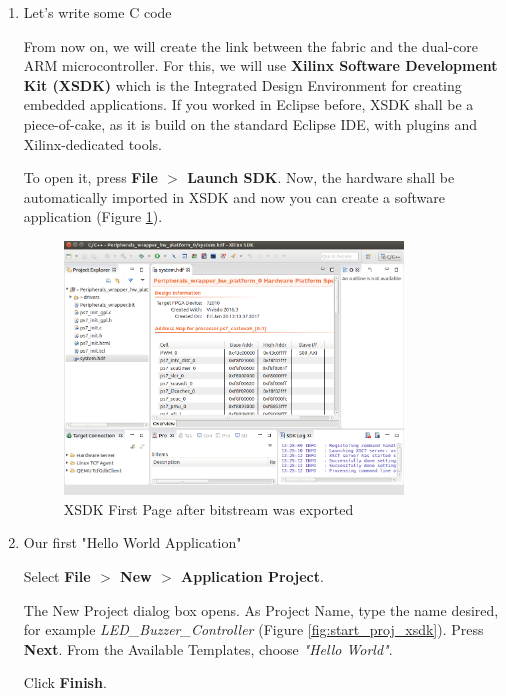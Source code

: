 \documentclass[portrait, margin=0.3in]{article}
\begin{document}
\begin{enumerate}
\newpage
 \item Let's write some C code 

From now on, we will create the link between the fabric and the dual-core ARM microcontroller. For this, we will use \textbf{Xilinx Software Development Kit (XSDK)} which is the Integrated Design Environment for creating embedded applications. If you worked in Eclipse before, XSDK shall be a piece-of-cake, as it is build on the standard Eclipse IDE, with plugins and Xilinx-dedicated tools. 

To open it, press \textbf{File $>$ Launch SDK}. Now, the hardware shall be automatically imported in XSDK and now you can create a software application (Figure \ref{fig:sdk_first_page}).



 
 \begin{figure}[h!]
    \centering
    \includegraphics[width=0.85\textwidth]{img/xsdk_first_page.png}
    \caption{XSDK First Page after bitstream was exported}
    \label{fig:sdk_first_page}
\end{figure}



 \item Our first "Hello World Application"

Select \textbf{File $>$ New $>$ Application Project}.

The New Project dialog box opens. As Project Name, type the name desired, for example
\textit{LED\_Buzzer\_Controller} (Figure \ref{fig:start_proj_xsdk}). Press \textbf{Next}. From the Available Templates, choose \textit{"Hello World"}. 

Click \textbf{Finish}. 



\end{enumerate}
\end{document}
